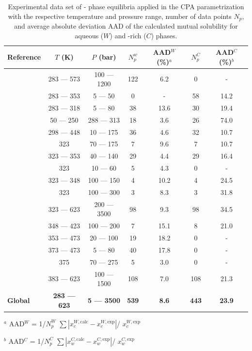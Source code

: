 \begin{table}[]
\caption{Experimental data set of - phase equilibria applied in the CPA parametrization with the respective temperature and pressure range, number of data points $N_p$, and average absolute deviation AAD of the calculated mutual solubility for aqueous ($W$) and -rich ($C$) phases.}
\centering
\begin{tabular}{lcccccc}
\hline
\hline
 \textbf{Reference} & $T$ (K) & $P$ (bar)  & $N_p^w$  & AAD$^W$ (\%)$^a$ & $N_p^C$ & AAD$^C$ (\%)$^b$ \\ 
 \hline
\citeauthor{Guo2014} \cite{Guo2014} & 283 — 573 & 100 — 1200 & 122 & 6.2  & 0 & - \\
\citeauthor{Meyer2015} \cite{Meyer2015} &  283  — 353 & 5  — 50 & 0 & - & 58 & 14.2 \\
\citeauthor{Valtz2004} \cite{Valtz2004} &  283 — 318 &  5 — 80 & 38 & 13.6 & 30 & 19.4 \\
\citeauthor{King1992} \cite{King1992} &  50 — 250 & 288 — 313 & 18 & 3.6 & 26 & 74.0 \\
\citeauthor{Hou2013} \cite{Hou2013} & 298 — 448 & 10 — 175 & 36 & 4.6 & 32 & 10.7 \\
\citeauthor{Briones1987} \cite{Briones1987} & 323 &  70 — 175 & 7 & 9.6 & 7 & 10.7 \\
\citeauthor{Bamberger2000} \cite{Bamberger2000} & 323 — 353 & 40 — 140 & 29 & 4.4 & 29 & 16.4 \\
\citeauthor{Rumpf1994} \cite{Rumpf1994} & 323 & 10 — 60 & 5 & 4.3 & 0 & - \\
\citeauthor{Dsouza1988} \cite{Dsouza1988} & 323 — 348 & 100 — 150 & 4 & 10.2 & 4 & 24.5 \\
 \citeauthor{Dohrn1993} \cite{Dohrn1993} &  323 & 100 — 300 & 3 & 8.3 & 3 & 31.8 \\
\citeauthor{Tödheide1963} \cite{Tödheide1963} & 323 — 623 & 200 — 3500 & 98 & 9.3 & 98 & 34.5 \\
\citeauthor{Sako1991} \cite{Sako1991} & 348 — 423 & 100 — 200 & 7 & 15.1 & 8 & 21.0 \\
\citeauthor{Nighswander1989} \cite{Nighswander1989} & 353 — 473 & 20 — 100 & 19 & 18.2 & 0 & - \\
\citeauthor{Muller1988} \cite{Muller1988} & 373 — 473 & 5 — 80 & 40 & 17.8 & 0 & - \\
\citeauthor{Tong2013} \cite{Tong2013} &  375 & 70 — 275 & 5 & 3.0 & 0 & - \\
\citeauthor{Takenouchi1964} \cite{Takenouchi1964} & 383 — 623 & 100 — 1500 & 108 & 7.0 & 108 & 21.3 \\ 
\hline 
\textbf{Global} & \textbf{283 — 623} & \textbf{5 — 3500} & \textbf{539} & \textbf{8.6} & \textbf{443} & \textbf{23.9} \\ 
 \hline
 \hline
\end{tabular}
\flushleft
\footnotesize{$^a$ AAD$^W$ = 1/$N_p^W$ $\sum |x_c^{W,\text{calc}}-x_c^{W,\text{exp}}|$/ $x_c^{W,\text{exp}}$} 

\footnotesize{$^b$ AAD$^C$ = 1/$N_p^C$ $\sum |x_w^{C,\text{calc}}-x_w^{C,\text{exp}}|$/ $x_w^{C,\text{exp}}$}
\label{EXPs_CW}
\end{table}


